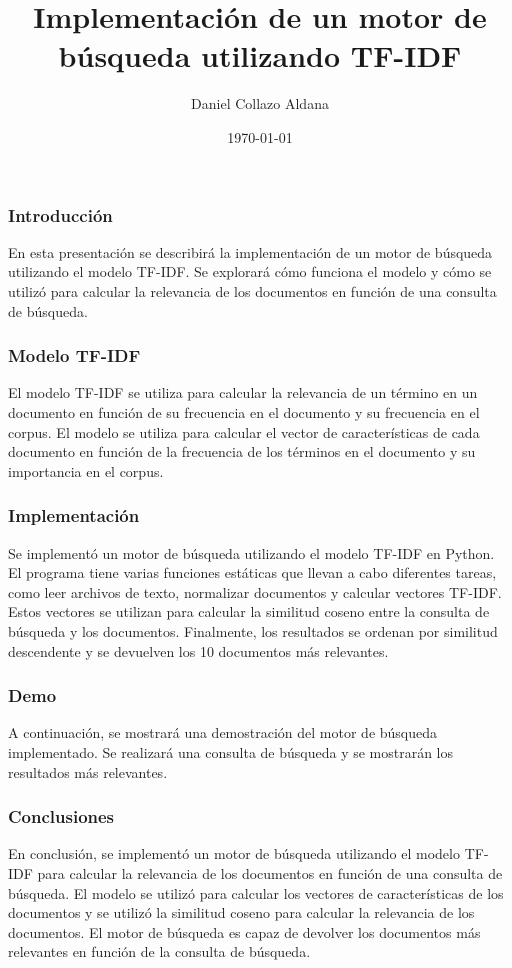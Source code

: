 \documentclass{beamer}
\title{Implementación de un motor de búsqueda utilizando TF-IDF}
\author{Daniel Collazo Aldana}
\institute{UH facultad de Matematicas}
\date{\today}
\begin{document}
\begin{frame}
\titlepage
\end{frame}

\begin{frame}
\frametitle{Introducción}
En esta presentación se describirá la implementación de un motor de búsqueda utilizando el modelo TF-IDF. Se explorará cómo funciona el modelo y cómo se utilizó para calcular la relevancia de los documentos en función de una consulta de búsqueda.
\end{frame}

\begin{frame}
\frametitle{Modelo TF-IDF}
El modelo TF-IDF se utiliza para calcular la relevancia de un término en un documento en función de su frecuencia en el documento y su frecuencia en el corpus. El modelo se utiliza para calcular el vector de características de cada documento en función de la frecuencia de los términos en el documento y su importancia en el corpus.
\end{frame}

\begin{frame}
\frametitle{Implementación}
Se implementó un motor de búsqueda utilizando el modelo TF-IDF en Python. El programa tiene varias funciones estáticas que llevan a cabo diferentes tareas, como leer archivos de texto, normalizar documentos y calcular vectores TF-IDF. Estos vectores se utilizan para calcular la similitud coseno entre la consulta de búsqueda y los documentos. Finalmente, los resultados se ordenan por similitud descendente y se devuelven los 10 documentos más relevantes.
\end{frame}

\begin{frame}
\frametitle{Demo}
A continuación, se mostrará una demostración del motor de búsqueda implementado. Se realizará una consulta de búsqueda y se mostrarán los resultados más relevantes.
\end{frame}

\begin{frame}
\frametitle{Conclusiones}
En conclusión, se implementó un motor de búsqueda utilizando el modelo TF-IDF para calcular la relevancia de los documentos en función de una consulta de búsqueda. El modelo se utilizó para calcular los vectores de características de los documentos y se utilizó la similitud coseno para calcular la relevancia de los documentos. El motor de búsqueda es capaz de devolver los documentos más relevantes en función de la consulta de búsqueda. 
\end{frame}
\end{document}
